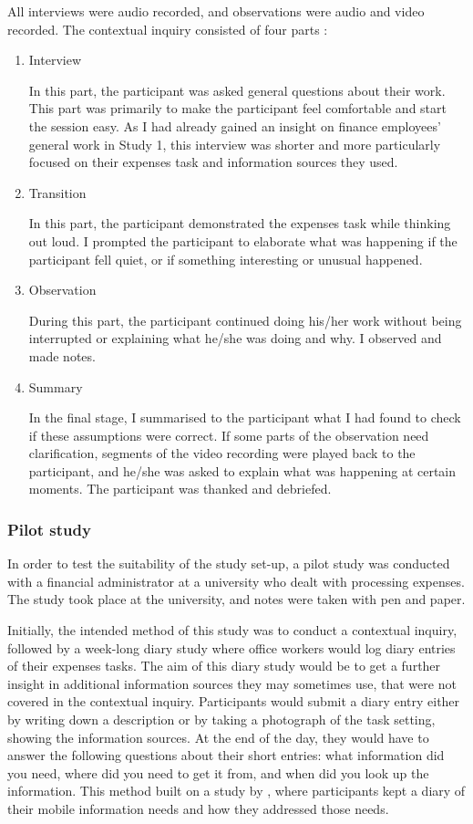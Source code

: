 All interviews were audio recorded, and observations were audio and video recorded. The contextual inquiry consisted of four parts \citet{Holtzblatt2014}:
\begin{enumerate}
\item 
Interview

In this part, the participant was asked general questions about their work. This part was primarily to make the participant feel comfortable and start the session easy. As I had already gained an insight on finance employees' general work in Study 1, this interview was shorter and more particularly focused on their expenses task and information sources they used. 
\item 
Transition

In this part, the participant demonstrated the expenses task while thinking out loud. I prompted the participant to elaborate what was happening if the participant fell quiet, or if something interesting or unusual happened.
\item 
Observation

During this part, the participant continued doing his/her work without being interrupted or explaining what he/she was doing and why. I observed and made notes.
\item 
Summary

In the final stage, I summarised to the participant what I had found to check if these assumptions were correct. If some parts of the observation need clarification, segments of the video recording were played back to the participant, and he/she was asked to explain what was happening at certain moments.
The participant was thanked and debriefed.
\end{enumerate}

\subsubsection{Pilot study}
In order to test the suitability of the study set-up, a pilot study was conducted with a financial administrator at a university who dealt with processing expenses. The study took place at the university, and notes were taken with pen and paper. 

Initially, the intended method of this study was to conduct a contextual inquiry, followed by a week-long diary study where office workers would log diary entries of their expenses tasks. The aim of this diary study would be to get a further insight in additional information sources they may sometimes use, that were not covered in the contextual inquiry.  Participants would submit a diary entry either by writing down a description or by taking a photograph of the task setting, showing the information sources. At the end of the day, they would have to answer the following questions about their short entries: what information did you need, where did you need to get it from, and when did you look up the information. This method built on a study by \citet{Sohn2008}, where participants kept a diary of their mobile information needs and how they addressed those needs. 

